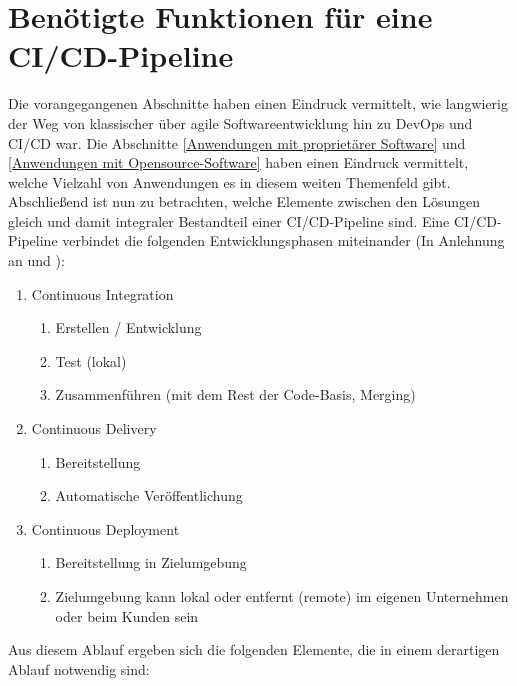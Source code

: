 \section{Benötigte Funktionen für eine CI/CD-Pipeline}
\label{Benoetigte Funktionen für eine CI/CD-Pipeline}
Die vorangegangenen Abschnitte haben einen Eindruck vermittelt, wie langwierig der Weg von klassischer über agile Softwareentwicklung hin zu \gls{DevOps} und \acrshort{CI}/\acrshort{CD} war. Die Abschnitte \ref{Anwendungen mit proprietärer Software}  und \ref{Anwendungen mit Opensource-Software} haben einen Eindruck vermittelt, welche Vielzahl von Anwendungen es in diesem weiten Themenfeld gibt. Abschließend ist nun zu betrachten, welche Elemente zwischen den Lösungen gleich und damit integraler Bestandteil einer \acrshort{CI}/\acrshort{CD}-Pipeline sind.\newline
Eine \acrshort{CI}/\acrshort{CD}-Pipeline \glqq{}verbindet\grqq{} die folgenden Entwicklungsphasen miteinander (In Anlehnung an \cite{redhat_cicd_pipline} und \cite{meyer_continuous_2014}):
\begin{enumerate}
    \item Continuous Integration
    \begin{enumerate}
        \item Erstellen / Entwicklung
        \item Test (lokal)
        \item Zusammenführen (mit dem Rest der Code-Basis, \glqq{}Merging\grqq{})
    \end{enumerate}
    \item Continuous Delivery
        \begin{enumerate}
        \item Bereitstellung
        \item Automatische Veröffentlichung 
    \end{enumerate}
    \item Continuous Deployment
        \begin{enumerate}
        \item Bereitstellung in Zielumgebung
        \item Zielumgebung kann lokal oder entfernt (remote) im eigenen Unternehmen oder beim Kunden sein
    \end{enumerate}
\end{enumerate}
Aus diesem Ablauf ergeben sich die folgenden Elemente, die in einem derartigen Ablauf notwendig sind:

